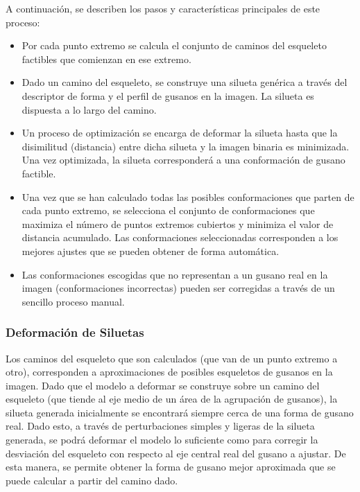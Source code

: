 A continuaci\'on, se describen los pasos y caracter\'isticas principales de este proceso:


\begin{itemize}
\item Por cada punto extremo se calcula el conjunto de caminos del esqueleto factibles
que comienzan en ese extremo.
\item Dado un camino del esqueleto, se construye una silueta gen\'erica a trav\'es
del descriptor de forma y el perfil de gusanos en la imagen. La silueta es dispuesta
a lo largo del camino.
\item Un proceso de optimizaci\'on se encarga de deformar la silueta hasta que la
disimilitud (distancia) entre dicha silueta y la imagen binaria es minimizada. Una
vez optimizada, la silueta corresponder\'a a una conformaci\'on de gusano factible.
\item Una vez que se han calculado todas las posibles conformaciones que parten 
de cada punto extremo, se selecciona el conjunto de conformaciones que maximiza
el n\'umero de puntos extremos cubiertos y minimiza el valor de distancia acumulado.
Las conformaciones seleccionadas corresponden a los mejores ajustes que se pueden
obtener de forma autom\'atica.
\item Las conformaciones escogidas que no representan a un gusano real en la imagen
(conformaciones incorrectas) pueden ser corregidas a trav\'es de un sencillo proceso
manual.
\end{itemize}

\subsubsection*{Deformaci\'on de Siluetas}
\label{sec:defsil}

Los caminos del esqueleto que son calculados (que van de un punto extremo a otro), 
corresponden a aproximaciones de posibles esqueletos de gusanos en la imagen. 
Dado que el modelo a deformar se construye sobre un camino del esqueleto
(que tiende al eje medio de un \'area de la agrupaci\'on de gusanos), la 
silueta generada inicialmente se encontrar\'a siempre cerca de una forma
de gusano real. Dado esto, a trav\'es de perturbaciones simples y ligeras de la silueta generada, 
se podr\'a deformar el modelo lo suficiente como para corregir la desviaci\'on del
esqueleto con respecto al eje central real del gusano a ajustar. De esta manera, se permite obtener  
la forma de gusano mejor aproximada que se puede calcular a partir del camino dado.\\

